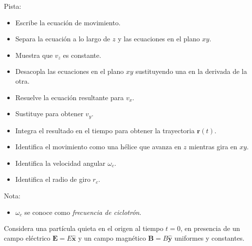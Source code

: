 \documentclass{exam}
\begin{document}
\begin{questions}
    Pista:
    \begin{itemize}
    \item Escribe la ecuación de movimiento.
    \item Separa la ecuación a lo largo de $z$ y las ecuaciones en el
      plano $xy$.
    \item Muestra que $v_z$ es constante.
    \item Desacopla las ecuaciones en el plano $xy$ sustituyendo una
      en la derivada de la otra.
    \item Resuelve la ecuación resultante para $v_x$.
    \item Sustituye para obtener $v_y$.
    \item Integra el resultado en el tiempo para obtener la
      trayectoria $\bm r(t)$.
    \item Identifica el movimiento como una hélice que avanza en $z$
      mientras gira en $xy$.
    \item Identifica la velocidad angular $\omega_c$.
    \item Identifica el radio de giro $r_c$.
    \end{itemize}
    Nota:
    \begin{itemize}
    \item $\omega_c$ se conoce como {\em frecuencia de ciclotrón}.
    \end{itemize}
  \question Considera una partícula quieta en el origen al tiempo
    $t=0$, en presencia de un campo eléctrico $\bm E=E\hat{\bm x}$ y
    un campo magnético $\bm B=B\hat{\bm y}$ uniformes y constantes.
\end{questions}
\end{document}
